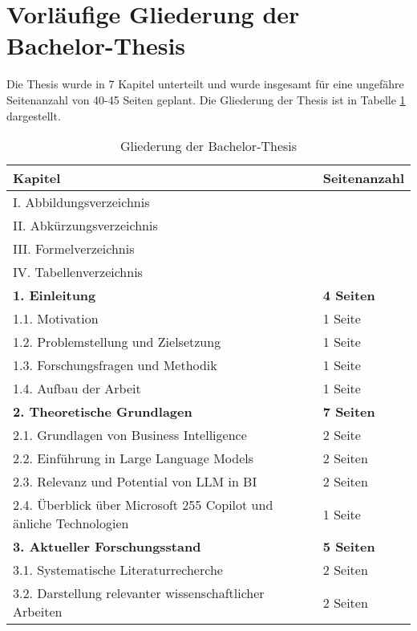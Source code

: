 
\section{Vorläufige Gliederung der Bachelor-Thesis}

Die Thesis wurde in 7 Kapitel unterteilt und wurde insgesamt für eine ungefähre Seitenanzahl von 40-45 Seiten geplant. Die Gliederung der Thesis ist in Tabelle \ref{tab:gliederung} dargestellt.

\begin{longtable}{|p{9cm}|p{2.5cm}|}
    \caption{Gliederung der Bachelor-Thesis} \label{tab:gliederung} \\
    \hline
    \textbf{Kapitel} & \textbf{Seitenanzahl} \\
    \hline
    I.      Abbildungsverzeichnis & \\
    \hline
    II.     Abkürzungsverzeichnis & \\
    \hline
    III.    Formelverzeichnis & \\
    \hline
    IV.     Tabellenverzeichnis & \\
    \hline
    \textbf{1. Einleitung} & \textbf{4 Seiten} \\
    \hline
        1.1. Motivation & 1 Seite \\
        \hline
        1.2. Problemstellung und Zielsetzung & 1 Seite \\
        \hline
        1.3. Forschungsfragen und Methodik & 1 Seite \\
        \hline
        1.4. Aufbau der Arbeit & 1 Seite \\
    \hline
    \textbf{2. Theoretische Grundlagen} & \textbf{7 Seiten} \\
    \hline
        2.1. Grundlagen von Business Intelligence & 2 Seite \\
        \hline
        2.2. Einführung in Large Language Models & 2 Seiten \\
        \hline
        2.3. Relevanz und Potential von LLM in BI & 2 Seiten \\
        \hline
        2.4. Überblick über Microsoft 255 Copilot und änliche Technologien & 1 Seite \\
    \hline
    \textbf{3. Aktueller Forschungsstand} & \textbf{5 Seiten} \\
    \hline
        3.1. Systematische Literaturrecherche & 2 Seiten \\
        \hline
        3.2. Darstellung relevanter wissenschaftlicher Arbeiten & 2 Seiten \\

\end{longtable}
